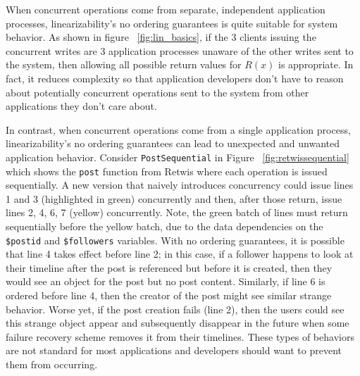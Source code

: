 When concurrent operations come from separate, independent application processes, linearizability's no ordering guarantees is quite suitable for system behavior. As shown in figure ~\ref{fig:lin_basics}, if the 3 clients issuing the concurrent writes are 3 application processes unaware of the other writes sent to the system, then allowing all possible return values for $R(x)$ is appropriate. In fact, it reduces complexity so that application developers don't have to reason about potentially concurrent operations sent to the system from other applications they don't care about. 

In contrast, when concurrent operations come from a single application process, linearizability's no ordering guarantees can lead to unexpected and unwanted application behavior.  Consider \texttt{PostSequential} in Figure ~\ref{fig:retwissequential} which shows the \texttt{post} function from Retwis where each operation is issued sequentially. A new version that naively introduces concurrency could issue lines 1 and 3 (highlighted in green) concurrently and then, after those return, issue lines 2, 4, 6, 7 (yellow) concurrently. Note, the green batch of lines must return sequentially before the yellow batch, due to the data dependencies on the \texttt{\$postid} and \texttt{\$followers} variables. With no ordering guarantees, it is possible that line 4 takes effect before line 2; in this case, if a follower happens to look at their timeline after the post is referenced but before it is created, then they would see an object for the post but no post content. Similarly, if line 6 is ordered before line 4, then the creator of the post might see similar strange behavior. Worse yet, if the post creation fails (line 2), then the users could see this strange object appear and subsequently disappear in the future when some failure recovery scheme removes it from their timelines. These types of behaviors are not standard for most applications and developers should want to prevent them from occurring.



